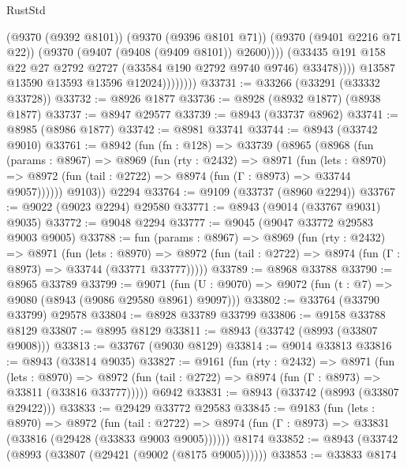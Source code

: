 \begin{lexlean}{RustStd}
\begin{coremodule}
                              (@9370 (@9392 @8101))
                              (@9370 (@9396 @8101 @71))
                              (@9370 (@9401 @2216 @71 @22))
                              (@9370 (@9407 (@9408 (@9409 @8101)) @2600))))
                          (@33435
                            @191
                            @158
                            @22
                            @27
                            @2792
                            @2727
                            (@33584 @190 @2792 @9740 @9746)
                            @33478))))
                    @13587
                    @13590
                    @13593
                    @13596
                    @12024))))))))
@33731 := @33266 (@33291 (@33332 @33728))
@33732 := @8926 @1877
@33736 := @8928 (@8932 @1877) (@8938 @1877)
@33737 := @8947 @29577
@33739 := @8943 (@33737 @8962)
@33741 := @8985 (@8986 @1877)
@33742 := @8981 @33741
@33744 := @8943 (@33742 @9010)
@33761 := @8942
    (fun (fn : @128) =>
    @33739
      (@8965
        (@8968
          (fun (params : @8967) =>
          @8969
            (fun (rty : @2432) =>
            @8971
              (fun (lets : @8970) =>
              @8972 (fun (tail : @2722) => @8974 (fun (Γ : @8973) => @33744 @9057))))))
        @9103))
    @2294
@33764 := @9109 (@33737 (@8960 @2294))
@33767 := @9022 (@9023 @2294) @29580
@33771 := @8943 (@9014 (@33767 @9031) @9035)
@33772 := @9048 @2294
@33777 := @9045 (@9047 @33772 @29583 @9003 @9005)
@33788 := fun (params : @8967) =>
  @8969
    (fun (rty : @2432) =>
    @8971
      (fun (lets : @8970) =>
      @8972 (fun (tail : @2722) => @8974 (fun (Γ : @8973) => @33744 (@33771 @33777)))))
@33789 := @8968 @33788
@33790 := @8965 @33789
@33799 := @9071
    (fun (U : @9070) => @9072 (fun (t : @7) => @9080 (@8943 (@9086 @29580 @8961) @9097)))
@33802 := @33764 (@33790 @33799) @29578
@33804 := @8928 @33789 @33799
@33806 := @9158 @33788 @8129
@33807 := @8995 @8129
@33811 := @8943 (@33742 (@8993 (@33807 @9008)))
@33813 := @33767 (@9030 @8129)
@33814 := @9014 @33813
@33816 := @8943 (@33814 @9035)
@33827 := @9161
    (fun (rty : @2432) =>
    @8971
      (fun (lets : @8970) =>
      @8972 (fun (tail : @2722) => @8974 (fun (Γ : @8973) => @33811 (@33816 @33777)))))
    @6942
@33831 := @8943 (@33742 (@8993 (@33807 @29422)))
@33833 := @29429 @33772 @29583
@33845 := @9183
    (fun (lets : @8970) =>
    @8972
      (fun (tail : @2722) =>
      @8974 (fun (Γ : @8973) => @33831 (@33816 (@29428 (@33833 @9003 @9005))))))
    @8174
@33852 := @8943 (@33742 (@8993 (@33807 (@29421 (@9002 (@8175 @9005))))))
@33853 := @33833 @8174

\end{coremodule}
\end{lexlean}

